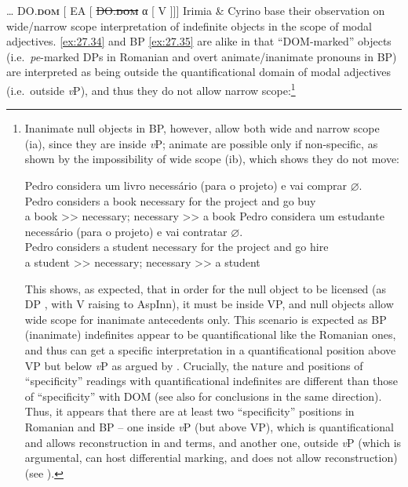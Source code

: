 \documentclass[output=paper]{langsci/langscibook}
\begin{document}
\ea\label{ex:27.33}
    \tss{} \dots{} \gls{DO}.\textbf{\textsc{dom}} [ \gls{EA}
    [ \sout{\gls{DO}.\textbf{\textsc{dom}}} α [ V \sout{} ]]]
\z
Irimia \& Cyrino base their observation on wide/narrow scope interpretation of
indefinite objects in the scope of modal adjectives.  \eqref{ex:27.34} and \gls{BP} \eqref{ex:27.35}
are alike in that ``DOM-marked'' objects (i.e.\ \emph{pe}{}-marked DPs in
Romanian and overt animate/inanimate pronouns in BP)  are interpreted as being
outside the quantificational domain of modal adjectives (i.e.\ outside
\emph{v}P), and thus they do not allow narrow scope:\footnote{Inanimate null
objects in \gls{BP}, however, allow both wide and narrow scope (ia), since they are
inside \emph{v}P; animate  are possible only if non-specific, as shown by
the impossibility of wide scope (ib), which shows they do not move:

\begin{xlist}
        \ea
            \gll    Pedro considera um livro necessário (para o   projeto) e vai comprar \textbf{$\varnothing$}.\\
                    Pedro  considers a    book necessary for   the project  and go buy\\
            \glt    a book >> necessary; necessary >> a book
        \ex
            \gll    Pedro considera um estudante necessário (para o   projeto) e   vai contratar \textbf{$\varnothing$}.\\
                    Pedro considers  a    student necessary    for   the project  and go hire\\
            \glt    *a student >> necessary; necessary >> a student
        \z
\end{xlist}
This shows, as expected, that in order for the null object to be licensed (as
DP , with V raising to AspInn), it must be inside VP, and null
objects allow wide scope for inanimate antecedents only.  This scenario is
expected as \gls{BP} (inanimate) indefinites appear to be quantificational like the
Romanian ones, and thus can get a specific interpretation in a quantificational
position above VP but below \emph{v}P as argued by
\citet{IrimiaCyrino2015,IrimiaCyrino2017}. Crucially, the nature and positions
of \enquote{specificity} readings with quantificational indefinites are
different than those of \enquote{specificity} with DOM (see also \citealt{Lopez2012} for conclusions in the same direction).
Thus, it appears that there are at least two \enquote{specificity} positions in
Romanian and \gls{BP} -- one inside \emph{v}P (but
above VP), which is quantificational and allows reconstruction in
 and  terms, and another one, outside
\emph{v}P (which is argumental, can host differential marking, and does not
allow reconstruction) (see \citealt{IrimiaCyrino2015,IrimiaCyrino2017}).}\pagebreak
\end{document}
